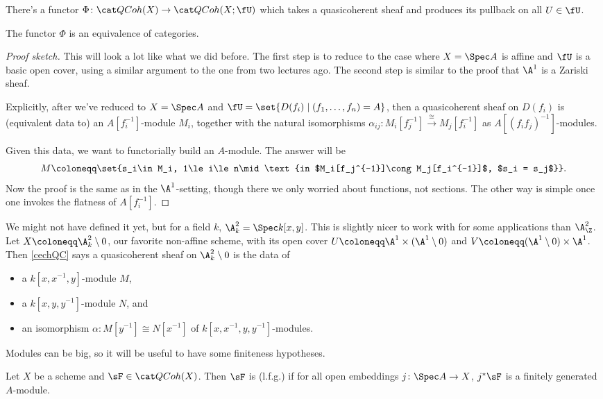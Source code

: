 There's a functor $\Phi\colon \QCoh(X)\to\QCoh(X;\fU)$ which takes a quasicoherent sheaf and produces its pullback
on all $U\in\fU$.
\begin{thm}[Serre]
\label{cechQC}
The functor $\Phi$ is an equivalence of categories.
\end{thm}
\begin{proof}[Proof sketch]
This will look a lot like what we did before. The first step is to reduce to the case where $X = \Spec A$ is affine
and $\fU$ is a basic open cover, using a similar argument to the one from two lectures ago. The second step is
similar to the proof that $\A^1$ is a Zariski sheaf.

Explicitly, after we've reduced to $X = \Spec A$ and $\fU = \set{D(f_i)\mid (f_1,\dotsc,f_n) = A}$, then a
quasicoherent sheaf on $D(f_i)$ is (equivalent data to) an $A[f_i^{-1}]$-module $M_i$, together with the natural
isomorphisms $\alpha_{ij}\colon M_i[f_j^{-1}]\overset\cong\to M_j[f_i^{-1}]$ as $A[(f_if_j)^{-1}]$-modules.

Given this data, we want to functorially build an $A$-module. The answer will be
\begin{equation}
	M\coloneqq \set{s_i\in M_i, 1\le i\le n\mid \text{in $M_i[f_j^{-1}]\cong M_j[f_i^{-1}]$, $s_i = s_j$}}.
\end{equation}
Now the proof is the same as in the $\A^1$-setting, though there we only worried about functions, not sections. The
other way is simple once one invokes the flatness of $A[f_i^{-1}]$.
\end{proof}
We might not have defined it yet, but for a field $k$, $\A_k^2 = \Spec k[x,y]$. This is slightly nicer to work with
for some applications than $\A_\Z^2$. Let $X \coloneqq \A^2_k\setminus 0$, our favorite non-affine scheme, with its
open cover $U\coloneqq \A^1\times(\A^1\setminus 0)$ and $V\coloneqq (\A^1\setminus 0)\times\A^1$. Then
\cref{cechQC} says a quasicoherent sheaf on $\A^2_k\setminus 0$ is the data of
\begin{itemize}
	\item a $k[x,x^{-1},y]$-module $M$,
	\item a $k[x, y, y^{-1}]$-module $N$, and
	\item an isomorphism $\alpha\colon M[y^{-1}]\cong N[x^{-1}]$ of $k[x,x^{-1},y,y^{-1}]$-modules.
\end{itemize}
Modules can be big, so it will be useful to have some finiteness hypotheses.
\begin{defn}
Let $X$ be a scheme and $\sF\in\QCoh(X)$. Then $\sF$ is  (l.f.g.) if for all open
embeddings $j\colon\Spec A\to X$, $j^*\sF$ is a finitely generated $A$-module.
\end{defn}
